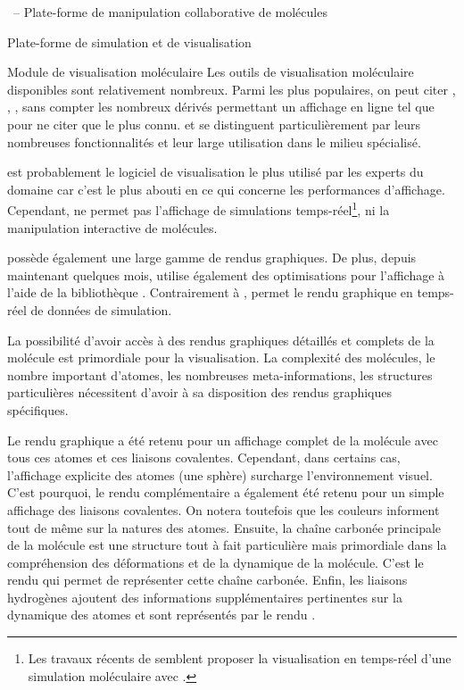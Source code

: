 \documentclass[myfrancais,ngerman,english,frenchb]{mythesis}
\begin{document}
\begin{mychapter}{\myShaddock\ -- Plate-forme de manipulation collaborative de molécules}
\begin{mysection}{Plate-forme de simulation et de visualisation}
			\begin{mysubsection}{Module de visualisation moléculaire}
				Les outils de visualisation moléculaire disponibles sont relativement nombreux.
				Parmi les plus populaires, on peut citer \myPyMOL {},  , \myChimera {}, \myRasmol {} sans compter les nombreux dérivés permettant un affichage en ligne tel que \myJmol {} pour ne citer que le plus connu.
				\myPyMOL et  se distinguent particulièrement par leurs nombreuses fonctionnalités et leur large utilisation dans le milieu spécialisé.

				\myPyMOL est probablement le logiciel de visualisation le plus utilisé par les experts du domaine car c'est le plus abouti en ce qui concerne les performances d'affichage.
				Cependant, \myPyMOL ne permet pas l'affichage de simulations temps-réel\footnote{Les travaux récents de  semblent proposer la visualisation en temps-réel d'une simulation moléculaire avec \myPyMOL.}, ni la manipulation interactive de molécules.

				 possède également une large gamme de rendus graphiques.
				De plus, depuis maintenant quelques mois,  utilise également des optimisations \myGPU pour l'affichage à l'aide de la bibliothèque \myCUDA.
				Contrairement à \myPyMOL,  permet le rendu graphique en temps-réel de données de simulation.

				La possibilité d'avoir accès à des rendus graphiques détaillés et complets de la molécule est primordiale pour la visualisation.
				La complexité des molécules, le nombre important d'atomes, les nombreuses meta-informations, les structures particulières nécessitent d'avoir à sa disposition des rendus graphiques spécifiques.

				Le rendu graphique \myCPK a été retenu pour un affichage complet de la molécule avec tous ces atomes et ces liaisons covalentes.
				Cependant, dans certains cas, l'affichage explicite des atomes (une sphère) surcharge l'environnement visuel.
				C'est pourquoi, le rendu complémentaire \myLicorice a également été retenu pour un simple affichage des liaisons covalentes.
				On notera toutefois que les couleurs informent tout de même sur la natures des atomes.
				Ensuite, la chaîne carbonée principale de la molécule est une structure tout à fait particulière mais primordiale dans la compréhension des déformations et de la dynamique de la molécule.
				C'est le rendu \myNewRibbon qui permet de représenter cette chaîne carbonée.
				Enfin, les liaisons hydrogènes ajoutent des informations supplémentaires pertinentes sur la dynamique des atomes et sont représentés par le rendu \myHBonds.


\end{mysubsection}
\end{mysection}
\end{mychapter}
\end{document}
